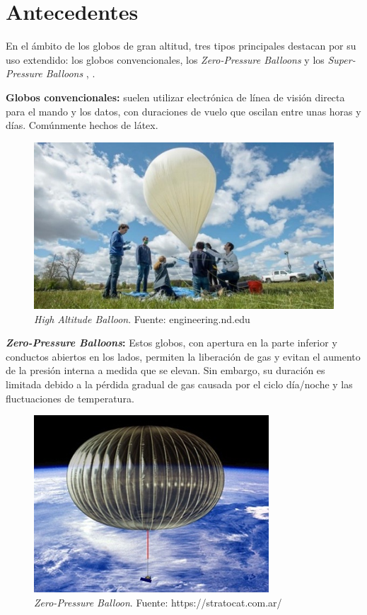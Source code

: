 \chapter{Antecedentes}
En el ámbito de los globos de gran altitud, tres tipos principales destacan por su uso extendido: los globos convencionales, los \emph{Zero-Pressure Balloons} y los \emph{Super-Pressure Balloons} \cite{NASA2022}, \cite{NASAColumbia}.


\textbf{Globos convencionales:} suelen utilizar electrónica de línea de visión directa para el mando y los datos, con duraciones de vuelo que oscilan entre unas horas y días. Comúnmente hechos de látex.

\begin{figure}[hbt!]
\centering
\includegraphics[width=.5\textwidth]{Pictures/HAB.jpg}
\caption{\emph{High Altitude Balloon}. Fuente: engineering.nd.edu }\label{fig:HAB}
\end{figure}


\textbf{\emph{Zero-Pressure Balloons}:} Estos globos, con apertura en la parte inferior y conductos abiertos en los lados, permiten la liberación de gas y evitan el aumento de la presión interna a medida que se elevan. Sin embargo, su duración es limitada debido a la pérdida gradual de gas causada por el ciclo día/noche y las fluctuaciones de temperatura.

\begin{figure}[hbt!]
\centering
\includegraphics[width=.8\textwidth]{Pictures/ZeroP.png}
\caption{\emph{Zero-Pressure Balloon}. Fuente: https://stratocat.com.ar/ }\label{fig:ZeroP}
\end{figure}

